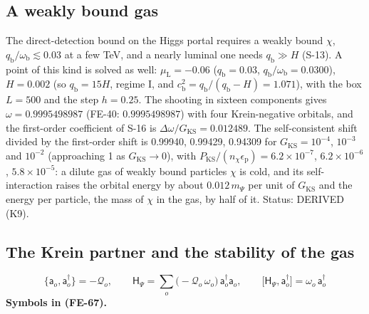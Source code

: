 \documentclass[
  10pt,
]{article}
\begin{document}
\hypertarget{a-weakly-bound-gas}{%
\subsection{A weakly bound gas}\label{a-weakly-bound-gas}}

The direct-detection bound on the Higgs portal requires a weakly bound
\(\chi\), \(q_{\mathrm{b}}/\omega_{\mathrm{b}} \lesssim 0.03\) at a few
TeV, and a nearly luminal one needs \(q_{\mathrm{b}} \gg H\) (S-13). A
point of this kind is solved as well: \(\mu_{\mathrm{L}} = -0.06\)
(\(q_{\mathrm{b}} = 0.03\),
\(q_{\mathrm{b}}/\omega_{\mathrm{b}} = 0.0300\)), \(H = 0.002\) (so
\(q_{\mathrm{b}} = 15H\), regime I, and
\(c_{\mathrm{b}}^2 = q_{\mathrm{b}}/(q_{\mathrm{b}} - H) = 1.071\)),
with the box \(L = 500\) and the step \(h = 0.25\). The shooting in
sixteen components gives \(\omega = 0.9995498987\) (FE-40:
\(0.9995498987\)) with four Krein-negative orbitals, and the first-order
coefficient of S-16 is \(\Delta\omega/G_{\mathrm{KS}} = 0.012489\). The
self-consistent shift divided by the first-order shift is 0.99940,
0.99429, 0.94309 for \(G_{\mathrm{KS}} = 10^{-4}\), \(10^{-3}\) and
\(10^{-2}\) (approaching 1 as \(G_{\mathrm{KS}} \to 0\)), with
\(P_{\mathrm{KS}}/(n_\chi\epsilon_{\mathrm{p}}) = 6.2\times10^{-7}\),
\(6.2\times10^{-6}\), \(5.8\times10^{-5}\): a dilute gas of weakly bound
particles \(\chi\) is cold, and its self-interaction raises the orbital
energy by about \(0.012\,m_\Psi\) per unit of \(G_{\mathrm{KS}}\) and
the energy per particle, the mass of \(\chi\) in the gas, by half of it.
Status: DERIVED (K9).

\hypertarget{the-krein-partner-and-the-stability-of-the-gas}{%
\subsection{The Krein partner and the stability of the
gas}\label{the-krein-partner-and-the-stability-of-the-gas}}

\[
\big\{\mathsf{a}_o, \mathsf{a}_o^\dagger\big\} = -\mathcal{Q}_o,\qquad
\mathsf{H}_\Psi = \sum_o\big(-\mathcal{Q}_o\,\omega_o\big)\,\mathsf{a}_o^\dagger\mathsf{a}_o,\qquad
\big[\mathsf{H}_\Psi, \mathsf{a}_o^\dagger\big] = \omega_o\,\mathsf{a}_o^\dagger \tag{FE-67}
\] \textbf{Symbols in (FE-67).}
\end{document}
